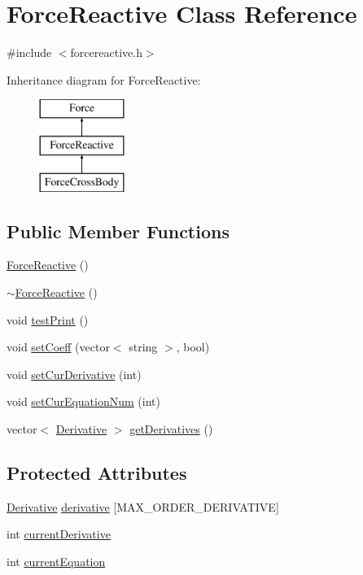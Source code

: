 \hypertarget{class_force_reactive}{\section{Force\-Reactive Class Reference}
\label{class_force_reactive}
}


{\ttfamily \#include $<$forcereactive.\-h$>$}

Inheritance diagram for Force\-Reactive\-:\begin{figure}[H]
\begin{center}
\leavevmode
\includegraphics[height=3.000000cm]{class_force_reactive}
\end{center}
\end{figure}
\subsection*{Public Member Functions}
\begin{DoxyCompactItemize}
\item 
\hyperlink{class_force_reactive_a620cb084872d0d7e1c5d596fc05b00e5}{Force\-Reactive} ()
\item 
\hyperlink{class_force_reactive_abb3aceb796c02f9289b6b270a36d1a9d}{$\sim$\-Force\-Reactive} ()
\item 
void \hyperlink{class_force_reactive_adc057ed59345c6f7a8f522e80ab9be08}{test\-Print} ()
\item 
void \hyperlink{class_force_reactive_a2594a1dd03dd983e7eb4204148698c34}{set\-Coeff} (vector$<$ string $>$, bool)
\item 
void \hyperlink{class_force_reactive_a6f1969b59143d74dfd05006dcb18414d}{set\-Cur\-Derivative} (int)
\item 
void \hyperlink{class_force_reactive_a6e1a59348fb32dc15a6918bfc42a4cad}{set\-Cur\-Equation\-Num} (int)
\item 
vector$<$ \hyperlink{class_derivative}{Derivative} $>$ \hyperlink{class_force_reactive_aff4ed3ee3ba6ff0b013fb02183c01af8}{get\-Derivatives} ()
\end{DoxyCompactItemize}
\subsection*{Protected Attributes}
\begin{DoxyCompactItemize}
\item 
\hyperlink{class_derivative}{Derivative} \hyperlink{class_force_reactive_ad0da544a781cfac29d317e8c59e9f3f0}{derivative} \mbox{[}M\-A\-X\-\_\-\-O\-R\-D\-E\-R\-\_\-\-D\-E\-R\-I\-V\-A\-T\-I\-V\-E\mbox{]}
\item 
int \hyperlink{class_force_reactive_a6c4302050614499c9ffeda4ad21928ec}{current\-Derivative}
\item 
int \hyperlink{class_force_reactive_a9aa1f30d63006bc56be33830da1d8331}{current\-Equation}
\end{DoxyCompactItemize}


